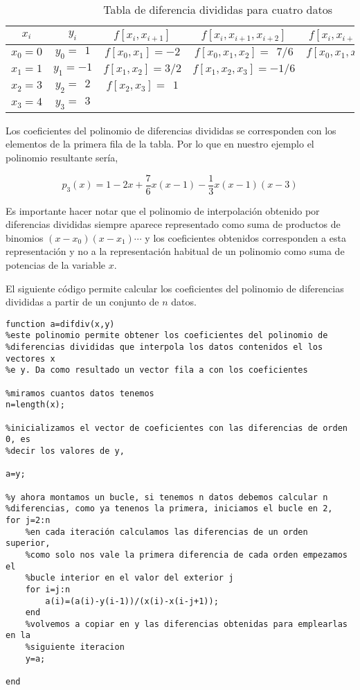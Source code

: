 \begin{table}[h]
\centering
\caption{Tabla de diferencia divididas para cuatro datos}
\begin{tabular}{ccccc}
$x_i$&$y_i$&$f\left[x_i,x_{i+1}\right]$&$f\left[x_i,x_{i+1},x_{i+2}\right]$&$f\left[x_i,x_{i+1},x_{i+2},x_{i+3}\right]$\\
\hline
$x_0=0$&$y_0=\ \  1$&$f\left[x_0,x_1\right]=-2$&$f\left[x_0,x_1,x_2\right]=\ \ 7/6$&$f\left[x_0,x_1,x_2,x_3\right]=-1/3$\\
$x_1=1$&$y_1=-1$&$f\left[x_1,x_2\right]=3/2$&$f\left[x_1,x_2,x_3\right]=-1/6$\\
$x_2=3$&$y_2=\ \ 2$&$f\left[x_2,x_3\right]=\ \ 1$\\
$x_3=4$&$y_3=\ \ 3$\\

\end{tabular}
\label{tabdif}
\end{table}

Los coeficientes del polinomio de diferencias divididas se corresponden con los elementos de la primera fila de la tabla. Por lo que en nuestro ejemplo el polinomio resultante sería,

\begin{equation*}
p_3(x)=1-2x+\frac{7}{6}x(x-1)-\frac{1}{3}x(x-1)(x-3)
\end{equation*}

Es importante hacer notar que el polinomio de interpolación obtenido por diferencias divididas siempre aparece representado como suma de productos de binomios $(x-x_0)(x-x_1)\cdots$ y los coeficientes obtenidos corresponden a esta representación y no a la representación habitual de un polinomio como suma de potencias de la variable $x$. 

El siguiente código permite calcular los coeficientes del polinomio de diferencias divididas a partir de un conjunto de $n$ datos.

\begin{verbatim}
function a=difdiv(x,y)
%este polinomio permite obtener los coeficientes del polinomio de
%diferencias divididas que interpola los datos contenidos el los vectores x
%e y. Da como resultado un vector fila a con los coeficientes

%miramos cuantos datos tenemos
n=length(x);

%inicializamos el vector de coeficientes con las diferencias de orden 0, es
%decir los valores de y,

a=y;

%y ahora montamos un bucle, si tenemos n datos debemos calcular n
%diferencias, como ya tenenos la primera, iniciamos el bucle en 2,
for j=2:n
    %en cada iteración calculamos las diferencias de un orden superior,
    %como solo nos vale la primera diferencia de cada orden empezamos el
    %bucle interior en el valor del exterior j
    for i=j:n
        a(i)=(a(i)-y(i-1))/(x(i)-x(i-j+1));
    end
    %volvemos a copiar en y las diferencias obtenidas para emplearlas en la
    %siguiente iteracion
    y=a;
    
end
\end{verbatim}

